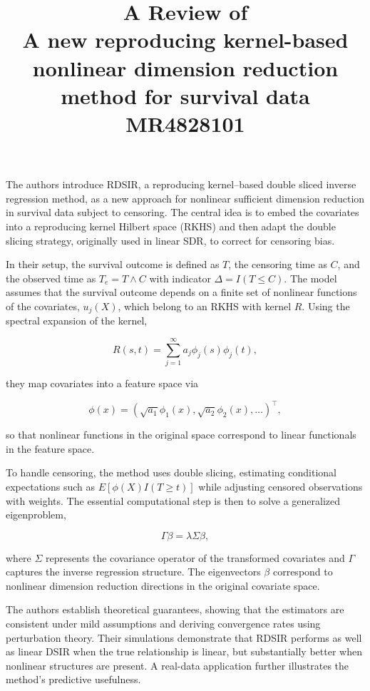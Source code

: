 \documentclass[11pt]{article}
\title{A Review of \\ A new reproducing kernel-based nonlinear dimension reduction method for survival data \\MR4828101}
\begin{document}
	\maketitle	
	
The authors introduce RDSIR, a reproducing kernel–based double sliced inverse regression method, as a new approach for nonlinear sufficient dimension reduction in survival data subject to censoring. The central idea is to embed the covariates into a reproducing kernel Hilbert space (RKHS) and then adapt the double slicing strategy, originally used in linear SDR, to correct for censoring bias.  

In their setup, the survival outcome is defined as \(T\), the censoring time as \(C\), and the observed time as \(T_e = T \wedge C\) with indicator \(\Delta = I(T \leq C)\). The model assumes that the survival outcome depends on a finite set of nonlinear functions of the covariates, \(u_j(X)\), which belong to an RKHS with kernel \(R\). Using the spectral expansion of the kernel,  

\[
R(s,t) = \sum_{j=1}^\infty a_j \phi_j(s)\phi_j(t),
\]

they map covariates into a feature space via  

\[
\phi(x) = (\sqrt{a_1}\phi_1(x), \sqrt{a_2}\phi_2(x),\dots)^\top,
\]

so that nonlinear functions in the original space correspond to linear functionals in the feature space.  

To handle censoring, the method uses double slicing, estimating conditional expectations such as \(E[\phi(X) I(T \ge t)]\) while adjusting censored observations with weights. The essential computational step is then to solve a generalized eigenproblem,  

\[
\Gamma \beta = \lambda \Sigma \beta,
\]

where \(\Sigma\) represents the covariance operator of the transformed covariates and \(\Gamma\) captures the inverse regression structure. The eigenvectors \(\beta\) correspond to nonlinear dimension reduction directions in the original covariate space.  

The authors establish theoretical guarantees, showing that the estimators are consistent under mild assumptions and deriving convergence rates using perturbation theory. Their simulations demonstrate that RDSIR performs as well as linear DSIR when the true relationship is linear, but substantially better when nonlinear structures are present. A real-data application further illustrates the method’s predictive usefulness.  
\end{document}
